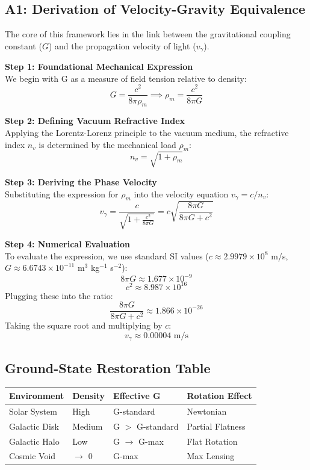 \documentclass[12pt,a4paper]{article}
\begin{document}
\subsection{A1: Derivation of Velocity-Gravity Equivalence}
The core of this framework lies in the link between the gravitational coupling constant ($G$) and the propagation velocity of light ($v_{\gamma}$). 

\textbf{Step 1: Foundational Mechanical Expression} \\
We begin with G as a measure of field tension relative to density:
\begin{equation}
G = \frac{c^2}{8\pi\rho_m} \implies \rho_m = \frac{c^2}{8\pi G}
\end{equation}

\textbf{Step 2: Defining Vacuum Refractive Index} \\
Applying the Lorentz-Lorenz principle to the vacuum medium, the refractive index $n_v$ is determined by the mechanical load $\rho_m$:
\begin{equation}
n_v = \sqrt{1 + \rho_m}
\end{equation}

\textbf{Step 3: Deriving the Phase Velocity} \\
Substituting the expression for $\rho_m$ into the velocity equation $v_{\gamma} = c/n_v$:
\begin{equation}
v_{\gamma} = \frac{c}{\sqrt{1 + \frac{c^2}{8\pi G}}} = c \sqrt{\frac{8\pi G}{8\pi G + c^2}}
\end{equation}

\textbf{Step 4: Numerical Evaluation} \\
To evaluate the expression, we use standard SI values ($c \approx 2.9979 \times 10^8$ m/s, $G \approx 6.6743 \times 10^{-11}$ m$^3$ kg$^{-1}$ s$^{-2}$):
$$8\pi G \approx 1.677 \times 10^{-9}$$ 
$$c^2 \approx 8.987 \times 10^{16}$$ 
Plugging these into the ratio: $$\frac{8\pi G}{8\pi G + c^2} \approx 1.866 \times 10^{-26}$$ 
Taking the square root and multiplying by $c$: $$v_{\gamma} \approx 0.00004 \text{ m/s}$$ 

\subsection{Ground-State Restoration Table}
\begin{center}
\begin{tabular}{llll}
\hline
Environment & Density & Effective G & Rotation Effect \\ \hline
Solar System & High & G-standard & Newtonian \\
Galactic Disk & Medium & G $>$ G-standard & Partial Flatness \\
Galactic Halo & Low & G $\to$ G-max & Flat Rotation \\
Cosmic Void & $\to$ 0 & G-max & Max Lensing \\ \hline
\end{tabular}
\end{center}
\end{document}
